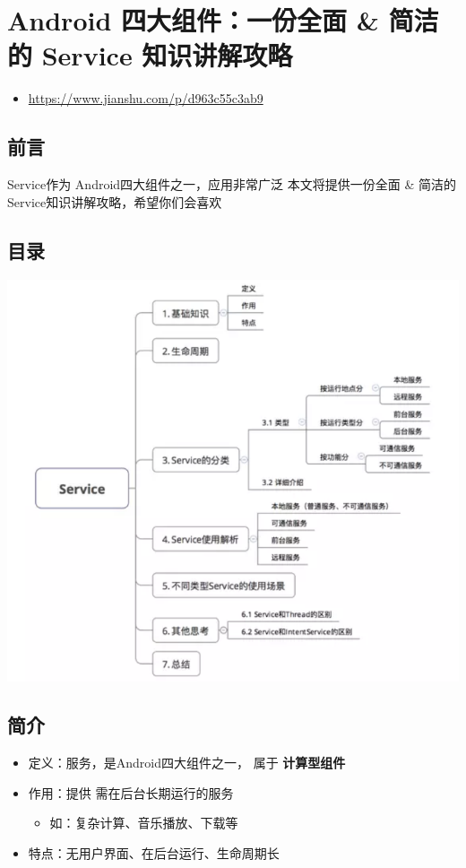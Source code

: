 \documentclass[9pt, b5paper]{article}
\begin{document}
\section{Android 四大组件：一份全面 \& 简洁的 Service 知识讲解攻略}
\label{sec-2}
\begin{itemize}
\item \url{https://www.jianshu.com/p/d963c55c3ab9}
\end{itemize}
\subsection{前言}
\label{sec-2-1}
Service作为 Android四大组件之一，应用非常广泛
本文将提供一份全面 \& 简洁的 Service知识讲解攻略，希望你们会喜欢
\subsection{目录}
\label{sec-2-2}

\includegraphics[width=.9\linewidth]{./pic/service.png}
\subsection{简介}
\label{sec-2-3}
\begin{itemize}
\item 定义：服务，是Android四大组件之一， 属于 \textbf{计算型组件}
\item 作用：提供 需在后台长期运行的服务
\begin{itemize}
\item 如：复杂计算、音乐播放、下载等
\end{itemize}
\item 特点：无用户界面、在后台运行、生命周期长
\end{itemize}
\end{document}
